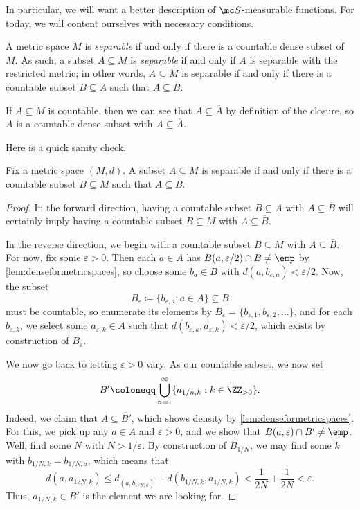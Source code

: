 \documentclass[../notes.tex]{subfiles}
\begin{document}
In particular, we will want a better description of $\mc S$-measurable functions. For today, we will content ourselves with necessary conditions.
\begin{definition}[Separable]
	A metric space $M$ is \textit{separable} if and only if there is a countable dense subset of $M$. As such, a subset $A\subseteq M$ is \textit{separable} if and only if $A$ is separable with the restricted metric; in other words, $A\subseteq M$ is separable if and only if there is a countable subset $B\subseteq A$ such that $A\subseteq\overline B$.
\end{definition}
\begin{example} \label{ex:countable-is-sep}
	If $A\subseteq M$ is countable, then we can see that $A\subseteq\overline A$ by definition of the closure, so $A$ is a countable dense subset with $A\subseteq\overline A$.
\end{example}
Here is a quick sanity check.
\begin{lemma} \label{lem:better-sep}
	Fix a metric space $(M,d)$. A subset $A\subseteq M$ is separable if and only if there is a countable subset $B\subseteq M$ such that $A\subseteq\overline B$.
\end{lemma}
\begin{proof}
	In the forward direction, having a countable subset $B\subseteq A$ with $A\subseteq\overline B$ will certainly imply having a countable subset $B\subseteq M$ with $A\subseteq\overline B$.

	In the reverse direction, we begin with a countable subset $B\subseteq M$ with $A\subseteq\overline B$. For now, fix some $\varepsilon>0$. Then each $a\in A$ has $B(a,\varepsilon/2)\cap B\ne\emp$ by \autoref{lem:denseformetricspaces}, so choose some $b_a\in B$ with $d(a,b_{\varepsilon,a})<\varepsilon/2$. Now, the subset
	\[B_\varepsilon\coloneqq\{b_{\varepsilon,a}:a\in A\}\subseteq B\]
	must be countable, so enumerate its elements by $B_\varepsilon=\{b_{\varepsilon,1},b_{\varepsilon,2},\ldots\}$, and for each $b_{\varepsilon,k}$, we select some $a_{\varepsilon,k}\in A$ such that $d(b_{\varepsilon,k},a_{\varepsilon,k})<\varepsilon/2$, which exists by construction of $B_\varepsilon$.

	We now go back to letting $\varepsilon>0$ vary. As our countable subset, we now set
	\[B'\coloneqq\bigcup_{n=1}^\infty\{a_{1/n,k}:k\in\ZZ_{>0}\}.\]
	Indeed, we claim that $A\subseteq\overline {B'}$, which shows density by \autoref{lem:denseformetricspaces}. For this, we pick up any $a\in A$ and $\varepsilon>0$, and we show that $B(a,\varepsilon)\cap B'\ne\emp$. Well, find some $N$ with $N>1/\varepsilon$. By construction of $B_{1/N}$, we may find some $k$ with $b_{1/N,k}=b_{1/N,a}$, which means that
	\[d(a,a_{1/N,k})\le d_(a,b_{1/N,k})+d(b_{1/N,k},a_{1/N,k})<\frac1{2N}+\frac1{2N}<\varepsilon.\]
	Thus, $a_{1/N,k}\in B'$ is the element we are looking for.
\end{proof}
\end{document}
